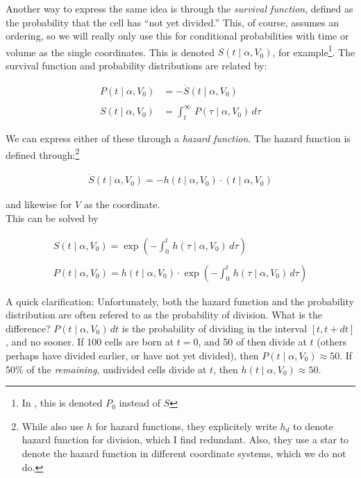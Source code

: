 \documentclass{article}
\begin{document}
Another way to express the same idea is through the \emph{survival function}, defined as the probability that the cell has ``not yet divided.'' This, of course, assumes an ordering, so we will really only use this for conditional probabilities with time or volume as the single coordinates. This is denoted $S(t \mid \alpha, V_0)$, for example\footnote{In \cite{Kennard2016}, this is denoted $P_0$ instead of $S$}. The survival function and probability distributions are related by:

\begin{align}
P(t \mid \alpha, V_0) &= - \dot{S}(t \mid \alpha, V_0)\\
\nonumber\\
S(t \mid \alpha, V_0) &= \int_t^\infty \, P(\tau \mid \alpha, V_0) \, d\tau 
\end{align}

We can express either of these through a \emph{hazard function}. The hazard function is defined through:\footnote{While \cite{Kennard2016} also use $h$ for hazard functions, they explicitely write $h_d$ to denote hazard function for division, which I find redundant. Also, they use a star to denote the hazard function in different coordinate systems, which we do not do.}

\begin{align}
\dot{S}(t \mid \alpha, V_0) = -h(t \mid \alpha, V_0) \cdot (t \mid \alpha, V_0)
\end{align}

and likewise for $V$ as the coordinate.\\

This can be solved by

\begin{align}
S(t \mid \alpha, V_0) = \exp \left(- \int_0^t \, h(\tau \mid \alpha, V_0) \, d\tau \right)\\
\nonumber\\
P(t \mid \alpha, V_0) = h(t \mid \alpha, V_0) \cdot \exp \left(- \int_0^t \, h(\tau \mid \alpha, V_0) \, d\tau \right) \label{eqHazard}
\end{align}

A quick clarification: Unfortunately, both the hazard function and the probability distribution are often refered to as the probability of division. What is the difference?  $P(t \mid \alpha, V_0)\, dt$ is the probability of dividing in the interval $[t, t + dt]$, and no sooner. If 100 cells are born at $t = 0$, and 50 of then divide at $t$ (others perhaps have divided earlier, or have not yet divided), then $P(t \mid \alpha, V_0) \approx 50$. If 50\% of the \emph{remaining}, undivided cells divide at $t$, then $h(t \mid \alpha, V_0) \approx 50$.
\end{document}
